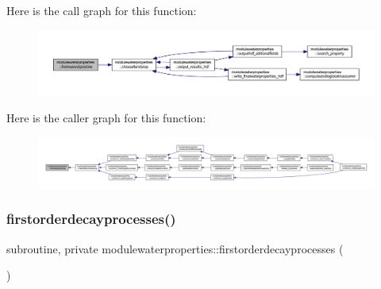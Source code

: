 Here is the call graph for this function\+:\nopagebreak
\begin{figure}[H]
\begin{center}
\leavevmode
\includegraphics[width=350pt]{namespacemodulewaterproperties_a9af27763ee733163a23f71ee92aafb09_cgraph}
\end{center}
\end{figure}
Here is the caller graph for this function\+:\nopagebreak
\begin{figure}[H]
\begin{center}
\leavevmode
\includegraphics[width=350pt]{namespacemodulewaterproperties_a9af27763ee733163a23f71ee92aafb09_icgraph}
\end{center}
\end{figure}
\mbox{\label{namespacemodulewaterproperties_a8e4fffcfd269b64a4795cf007ee2b707}} 
\subsubsection{\texorpdfstring{firstorderdecayprocesses()}{firstorderdecayprocesses()}}
{\footnotesize\ttfamily subroutine, private modulewaterproperties\+::firstorderdecayprocesses (\begin{DoxyParamCaption}{ }\end{DoxyParamCaption})\hspace{0.3cm}{\ttfamily [private]}}

